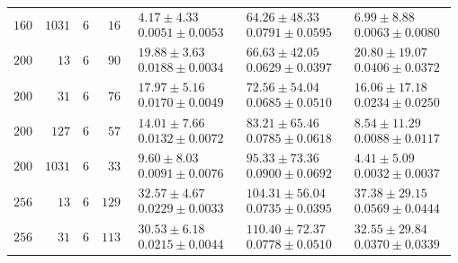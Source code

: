 \begin{tabular}{@{}rrrrrrr@{}}
  $160$ & $1031$ & $6$ & $16$ & $\substack{4.17\mathbin{\pm}4.33\\0.0051\mathbin{\pm}0.0053}$ & $\substack{64.26\mathbin{\pm}48.33\\0.0791\mathbin{\pm}0.0595}$ & $\substack{6.99\mathbin{\pm}8.88\\0.0063\mathbin{\pm}0.0080}$ \\
  $200$ & $13$ & $6$ & $90$ & $\substack{19.88\mathbin{\pm}3.63\\0.0188\mathbin{\pm}0.0034}$ & $\substack{66.63\mathbin{\pm}42.05\\0.0629\mathbin{\pm}0.0397}$ & $\substack{20.80\mathbin{\pm}19.07\\0.0406\mathbin{\pm}0.0372}$ \\
  $200$ & $31$ & $6$ & $76$ & $\substack{17.97\mathbin{\pm}5.16\\0.0170\mathbin{\pm}0.0049}$ & $\substack{72.56\mathbin{\pm}54.04\\0.0685\mathbin{\pm}0.0510}$ & $\substack{16.06\mathbin{\pm}17.18\\0.0234\mathbin{\pm}0.0250}$ \\
  $200$ & $127$ & $6$ & $57$ & $\substack{14.01\mathbin{\pm}7.66\\0.0132\mathbin{\pm}0.0072}$ & $\substack{83.21\mathbin{\pm}65.46\\0.0785\mathbin{\pm}0.0618}$ & $\substack{8.54\mathbin{\pm}11.29\\0.0088\mathbin{\pm}0.0117}$ \\
  $200$ & $1031$ & $6$ & $33$ & $\substack{9.60\mathbin{\pm}8.03\\0.0091\mathbin{\pm}0.0076}$ & $\substack{95.33\mathbin{\pm}73.36\\0.0900\mathbin{\pm}0.0692}$ & $\substack{4.41\mathbin{\pm}5.09\\0.0032\mathbin{\pm}0.0037}$ \\
  $256$ & $13$ & $6$ & $129$ & $\substack{32.57\mathbin{\pm}4.67\\0.0229\mathbin{\pm}0.0033}$ & $\substack{104.31\mathbin{\pm}56.04\\0.0735\mathbin{\pm}0.0395}$ & $\substack{37.38\mathbin{\pm}29.15\\0.0569\mathbin{\pm}0.0444}$ \\
  $256$ & $31$ & $6$ & $113$ & $\substack{30.53\mathbin{\pm}6.18\\0.0215\mathbin{\pm}0.0044}$ & $\substack{110.40\mathbin{\pm}72.37\\0.0778\mathbin{\pm}0.0510}$ & $\substack{32.55\mathbin{\pm}29.84\\0.0370\mathbin{\pm}0.0339}$ \\

\end{tabular}
